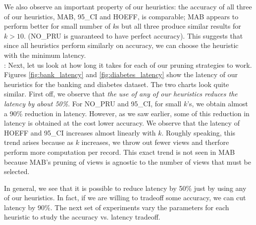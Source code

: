 We also observe an important property of our heuristics: the accuracy of all
three of our heuristics, MAB, 95\_CI and HOEFF, is comparable; MAB appears to
perform better for small number of $k$s but all three produce similar results
for $k>10$. (NO\_PRU is guaranteed to have perfect accuracy).
This suggests that since all heuristics perform similarly on accuracy, we can
choose the heuristic with the minimum latency.\\


:
Next, let us look at how long it takes for each of our pruning strategies to
work.
Figures \ref{fig:bank_latency} and \ref{fig:diabetes_latency} show the latency
of our heuristics for the banking and diabetes dataset.
The two charts look quite similar.
First off, we observe that {\it the use of any of our heuristics reduces the
latency by about 50\%}.
For NO\_PRU and 95\_CI, for small $k$'s, we obtain almost a 90\% reduction in
latency. However, as we saw earlier, some of this reduction in latency is
obtained at the cost lower accuracy.
We observe that the latency of HOEFF and 95\_CI increases almost linearly
with $k$.
Roughly speaking, this trend arises because as $k$
increases, we throw out fewer views and therfore perform more
computation per record.
This exact trend is not seen in MAB because MAB's pruning of views is agnostic
to the number of views that must be selected.

In general, we see that it is possible to reduce latency by 50\% just by using
any of our heuristics.
In fact, if we are willing to tradeoff some accuracy, we can cut latency by
90\%.
The next set of experiments vary the parameters for each heuristic to study
the accuracy vs. latency tradeoff.\\


